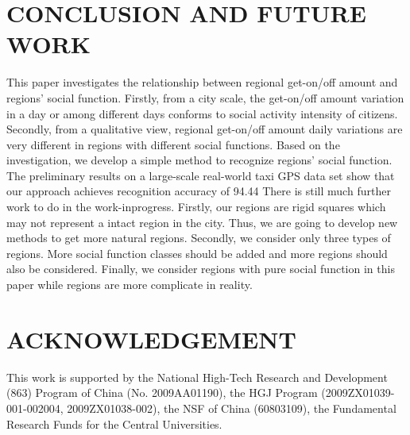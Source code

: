 \documentclass[a4paper, 10pt, conference]{ieeeconf}      %
\begin{document}
\section{CONCLUSION AND FUTURE WORK}%
This paper investigates the relationship between regional get-on/off amount and regions’ social function. Firstly, from a city scale, the get-on/off amount variation in a day or among different days conforms to social activity intensity of citizens. Secondly, from a qualitative view, regional get-on/off amount daily variations are very different in regions with different social functions.
Based on the investigation, we develop a simple method to recognize regions’ social function. The preliminary results on a large-scale real-world taxi GPS data set show that our approach achieves recognition accuracy of 94.44%
There is still much further work to do in the work-inprogress. Firstly, our regions are rigid squares which may not represent a intact region in the city. Thus, we are going to develop new methods to get more natural regions. Secondly, we consider only three types of regions. More social function classes should be added and more regions should also be considered. Finally, we consider regions with pure social function in this paper while regions are more complicate in reality.

\addtolength{\textheight}{-12cm}   %

\section*{ACKNOWLEDGEMENT}

This work is supported by the National High-Tech Research and Development (863) Program of China (No. 2009AA01190), the HGJ Program (2009ZX01039-001-002004, 2009ZX01038-002), the NSF of China (60803109), the Fundamental Research Funds for the Central Universities.
\end{document}
